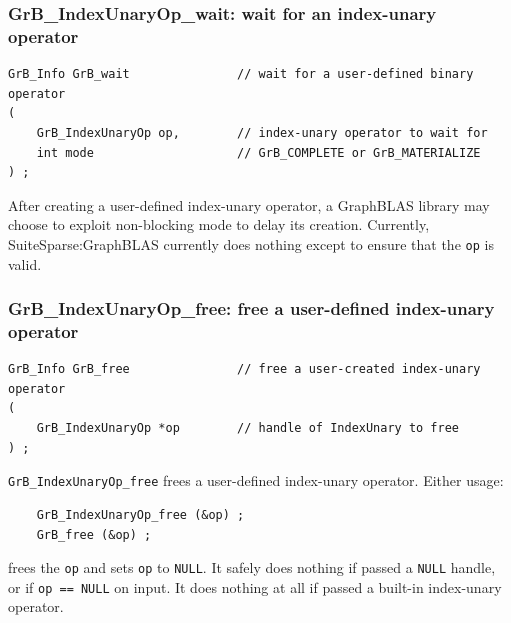 \subsubsection{{\sf GrB\_IndexUnaryOp\_wait:} wait for an index-unary operator}
\label{idxunop_wait}

\begin{mdframed}[userdefinedwidth=6in]
{\footnotesize
\begin{verbatim}
GrB_Info GrB_wait               // wait for a user-defined binary operator
(
    GrB_IndexUnaryOp op,        // index-unary operator to wait for
    int mode                    // GrB_COMPLETE or GrB_MATERIALIZE
) ;
\end{verbatim}
}\end{mdframed}

After creating a user-defined index-unary operator, a GraphBLAS library may choose
to exploit non-blocking mode to delay its creation.  Currently,
SuiteSparse:GraphBLAS currently does nothing except to ensure that the
\verb'op' is valid.

\newpage
\subsubsection{{\sf GrB\_IndexUnaryOp\_free:} free a user-defined index-unary operator}
\label{idxunop_free}

\begin{mdframed}[userdefinedwidth=6in]
{\footnotesize
\begin{verbatim}
GrB_Info GrB_free               // free a user-created index-unary operator
(
    GrB_IndexUnaryOp *op        // handle of IndexUnary to free
) ;
\end{verbatim}
}\end{mdframed}

\verb'GrB_IndexUnaryOp_free' frees a user-defined index-unary operator.  Either usage:

    {\small
    \begin{verbatim}
    GrB_IndexUnaryOp_free (&op) ;
    GrB_free (&op) ; \end{verbatim}}

\noindent
frees the \verb'op' and sets \verb'op' to \verb'NULL'.  It safely
does nothing if passed a \verb'NULL' handle, or if \verb'op == NULL' on
input.  It does nothing at all if passed a built-in index-unary operator.

